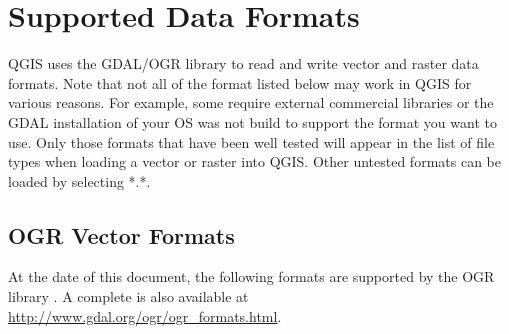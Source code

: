 \section{Supported Data Formats}\label{appdx_data_formats}


QGIS uses the GDAL/OGR library to read and write vector and raster data
formats. Note that not all of the format listed below may work in QGIS for
various reasons. For example, some require external commercial libraries or
the GDAL installation of your OS was not build to support the format you want
to use. Only those formats that have been well tested will appear in the list
of file types when loading a vector or raster into QGIS. Other untested
formats can be loaded by selecting *.*. 

\subsection{OGR Vector Formats}\label{appdx_ogr}

At the date of this document, the following formats are supported by the OGR
library \cite{OGRweb}. A complete is also available at
\url{http://www.gdal.org/ogr/ogr_formats.html}.

